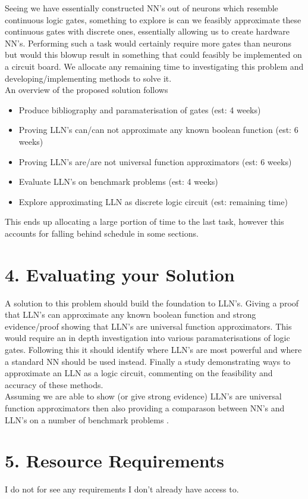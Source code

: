 \documentclass[11pt, a4paper, twoside, openright]{report}
\begin{document}
Seeing we have essentially constructed NN's out of neurons which resemble continuous logic gates, something to explore is can we feasibly approximate these continuous gates with discrete ones, essentially allowing us to create hardware NN's. Performing such a task would certainly require more gates than neurons but would this blowup result in something that could feasibly be implemented on a circuit board. We allocate any remaining time to investigating this problem and developing/implementing methods to solve it.\\

An overview of the proposed solution follows
\begin{itemize}
\item Produce bibliography and paramaterisation of gates (est: 4 weeks)
\item Proving LLN's can/can not approximate any known boolean function (est: 6 weeks)
\item Proving LLN's are/are not universal function approximators (est: 6 weeks)
\item Evaluate LLN's on benchmark problems (est: 4 weeks)
\item Explore approximating LLN as discrete logic circuit (est: remaining time)
\end{itemize}
This ends up allocating a large portion of time to the last task, however this accounts for falling behind schedule in some sections.


\section*{4. Evaluating your Solution}

A solution to this problem should build the foundation to LLN's. Giving a proof that LLN's can approximate any known boolean function and strong evidence/proof showing that LLN's are universal function approximators. This would require an in depth investigation into various paramaterisations of logic gates. Following this it should identify where LLN's are most powerful and where a standard NN should be used instead. Finally a study demonstrating ways to approximate an LLN as a logic circuit, commenting on the feasibility and accuracy of these methods.\\

Assuming we are able to show (or give strong evidence) LLN's are universal function approximators then also providing a comparason between NN's and LLN's on a number of benchmark problems .

\section*{5. Resource Requirements}

I do not for see any requirements I don't already have access to.

\backmatter

%


\end{document}
